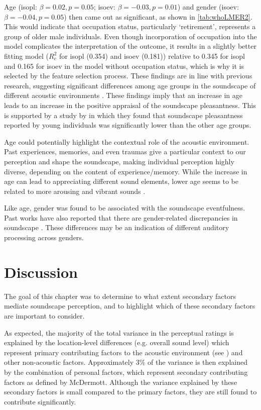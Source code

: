 Age (\gls{isopl}: $\beta=0.02, p=0.05$; \gls{isoev}: $\beta=-0.03, p=0.01$) and gender (\gls{isoev}: $\beta=-0.04, p=0.05$) then came out as significant, as shown in \cref{tab:whoLMER2}. This would indicate that occupation status, particularly `retirement', represents a group of older male individuals. Even though incorporation of occupation into the model complicates the interpretation of the outcome, it results in a slightly better fitting model ($R^2_c$ for \gls{isopl} (0.354) and \gls{isoev} (0.181)) relative to 0.345 for \gls{isopl} and 0.165 for \gls{isoev} in the model without occupation status, which is why it is selected by the feature selection process. These findings are in line with previous research, suggesting significant differences among age groups in the soundscape of different acoustic environments \citep{Ren2016Soundscape,Yang2005Acoustic}. These findings imply that an increase in age leads to an increase in the positive appraisal of the soundscape pleasantness. This is supported by a study by \citet{Aydin2016Assessment} in which they found that soundscape pleasantness reported by young individuals was significantly lower than the other age groups.

Age could potentially highlight the contextual role of the acoustic environment. Past experiences, memories, and even traumas give a particular context to our perception and shape the soundscape, making individual perception highly diverse, depending on the content of experience/memory. While the increase in age can lead to appreciating different sound elements, lower age seems to be related to more arousing and vibrant sounds \citep{Yang2005Acoustic}.

Like age, gender was found to be associated with the soundscape eventfulness. Past works have also reported that there are gender-related discrepancies in soundscape \citep{Croome1977Noise,Yang2005Acoustic}. These differences may be an indication of different auditory processing across genders.

\section{Discussion}
The goal of this chapter was to determine to what extent secondary factors mediate soundscape perception, and to highlight which of these secondary factors are important to consider. 

As expected, the majority of the total variance in the perceptual ratings is explained by the location-level differences (e.g. overall sound level) which represent primary contributing factors to the acoustic environment (see \citet{McDermott2012Auditory}) and other non-acoustic factors. Approximately 3\% of the variance is then explained by the combination of personal factors, which represent secondary contributing factors as defined by McDermott. Although the variance explained by these secondary factors is small compared to the primary factors, they are still found to contribute significantly. 

